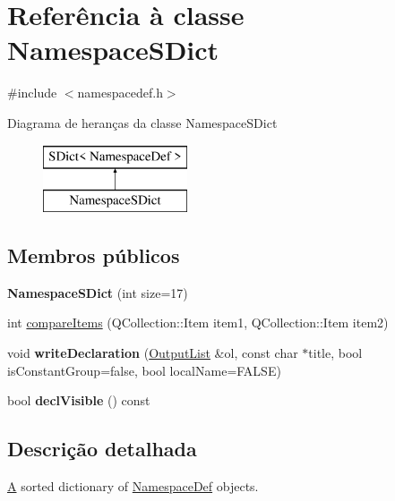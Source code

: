 \hypertarget{class_namespace_s_dict}{\section{Referência à classe Namespace\-S\-Dict}
\label{class_namespace_s_dict}
}


{\ttfamily \#include $<$namespacedef.\-h$>$}

Diagrama de heranças da classe Namespace\-S\-Dict\begin{figure}[H]
\begin{center}
\leavevmode
\includegraphics[height=2.000000cm]{class_namespace_s_dict}
\end{center}
\end{figure}
\subsection*{Membros públicos}
\begin{DoxyCompactItemize}
\item 
\hypertarget{class_namespace_s_dict_a0690c8a755935a9f22b7d6f9b080bef0}{{\bfseries Namespace\-S\-Dict} (int size=17)}\label{class_namespace_s_dict_a0690c8a755935a9f22b7d6f9b080bef0}

\item 
int \hyperlink{class_namespace_s_dict_a219450accf048597ffc7113ecde4c402}{compare\-Items} (Q\-Collection\-::\-Item item1, Q\-Collection\-::\-Item item2)
\item 
\hypertarget{class_namespace_s_dict_a81b0935f3c4ca045b96af8632524ec38}{void {\bfseries write\-Declaration} (\hyperlink{class_output_list}{Output\-List} \&ol, const char $\ast$title, bool is\-Constant\-Group=false, bool local\-Name=F\-A\-L\-S\-E)}\label{class_namespace_s_dict_a81b0935f3c4ca045b96af8632524ec38}

\item 
\hypertarget{class_namespace_s_dict_aedd04700c60d04c1dbcce71a94a22eac}{bool {\bfseries decl\-Visible} () const }\label{class_namespace_s_dict_aedd04700c60d04c1dbcce71a94a22eac}

\end{DoxyCompactItemize}


\subsection{Descrição detalhada}
\hyperlink{class_a}{A} sorted dictionary of \hyperlink{class_namespace_def}{Namespace\-Def} objects. 

